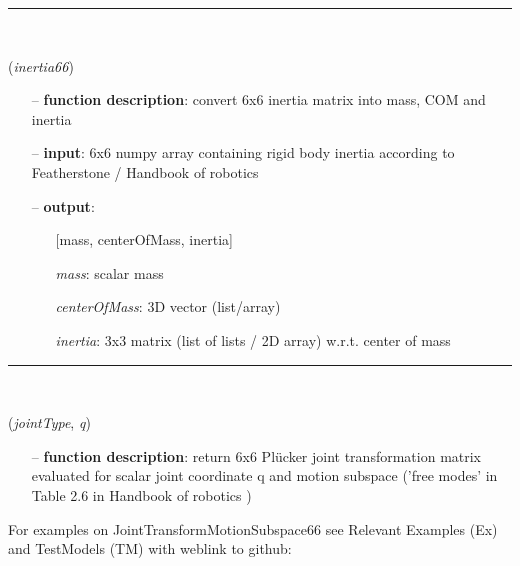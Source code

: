 \begin{itemize}[leftmargin=1.4cm]
\begin{itemize}[leftmargin=1.4cm]
\begin{itemize}[leftmargin=0.5cm]
\begin{itemize}[leftmargin=1.4cm]
\begin{itemize}[leftmargin=1.4cm]
\begin{itemize}[leftmargin=0.5cm]
\begin{itemize}[leftmargin=1.4cm]
\begin{itemize}[leftmargin=0.5cm]
\begin{itemize}[leftmargin=1.4cm]
\begin{itemize}[leftmargin=1.4cm]
\begin{itemize}[leftmargin=1.4cm]
%
\noindent\rule{8cm}{0.75pt}\vspace{1pt} \\ 
\begin{flushleft}
\label{sec:kinematicTree:Inertia66toMassCOMinertia}
({\it inertia66})
\end{flushleft}
\setlength{\itemindent}{0.7cm}
\begin{itemize}[leftmargin=0.7cm]
\item[--]
{\bf function description}: convert 6x6 inertia matrix into mass, COM and inertia
\item[--]
{\bf input}: 6x6 numpy array containing rigid body inertia according to Featherstone / Handbook of robotics \cite{Siciliano2016}
\item[--]
{\bf output}: \vspace{-6pt}
\begin{itemize}[leftmargin=1.2cm]
\setlength{\itemindent}{-0.7cm}
\item[][mass, centerOfMass, inertia]
\item[]{\it mass}: scalar mass
\item[]{\it centerOfMass}: 3D vector (list/array)
\item[]{\it inertia}: 3x3 matrix (list of lists / 2D array) w.r.t. center of mass
\end{itemize}
\vspace{12pt}\end{itemize}
%
\noindent\rule{8cm}{0.75pt}\vspace{1pt} \\ 
\begin{flushleft}
\label{sec:kinematicTree:JointTransformMotionSubspace66}
({\it jointType}, {\it q})
\end{flushleft}
\setlength{\itemindent}{0.7cm}
\begin{itemize}[leftmargin=0.7cm]
\item[--]
{\bf function description}: return 6x6 Pl\"ucker joint transformation matrix evaluated for scalar joint coordinate q and motion subspace ('free modes' in Table 2.6 in Handbook of robotics \cite{Siciliano2016})
\vspace{12pt}\end{itemize}
%
%
\noindent For examples on JointTransformMotionSubspace66 see Relevant Examples (Ex) and TestModels (TM) with weblink to github:

\end{itemize}
\end{itemize}
\end{itemize}
\end{itemize}
\end{itemize}
\end{itemize}
\end{itemize}
\end{itemize}
\end{itemize}
\end{itemize}
\end{itemize}
